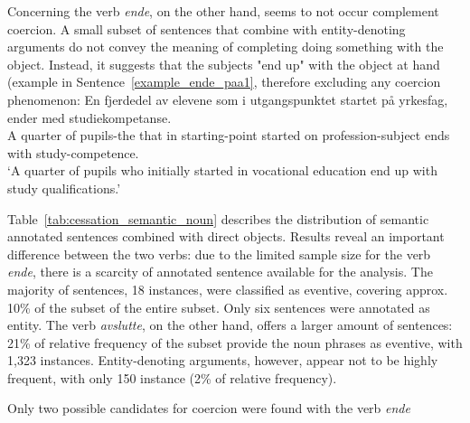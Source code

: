 \documentclass{article}
\begin{document}
Concerning the verb \emph{ende}, on the other hand, seems to not occur complement coercion. A small subset of sentences that combine with entity-denoting arguments do not convey the meaning of completing doing something with the object. Instead, it suggests that the subjects "end up" with the object at hand (example in Sentence~\ref{example_ende_paa1}, therefore excluding any coercion phenomenon:
    \ea \label{example_ende_paa1} %
    \gll En fjerdedel av elevene som i utgangspunktet startet på yrkesfag, ender med studiekompetanse.\\
    A quarter of pupils-the that in starting-point started on profession-subject ends with study-competence.\\
    \glt ‘A quarter of pupils who initially started in vocational education end up with study qualifications.’
    \z

Table~\ref{tab:cessation_semantic_noun} describes the distribution of semantic annotated sentences combined with direct objects. Results reveal an important difference between the two verbs: due to the limited sample size  for the verb \emph{ende}, there is a scarcity of annotated sentence available for the analysis. The majority of sentences, 18 instances, were classified as eventive, covering approx. 10\% of the subset of the entire subset. Only six sentences were annotated as entity. The verb \emph{avslutte}, on the other hand, offers a larger amount of sentences: 21\% of relative frequency of the subset provide the noun phrases as eventive, with 1,323 instances. Entity-denoting arguments, however, appear not to be highly frequent, with only 150 instance (2\% of relative frequency). 



Only two possible candidates for coercion were found with the verb \emph{ende}
\end{document}
